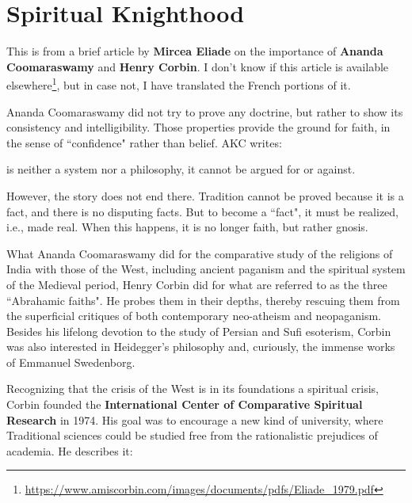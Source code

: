 \section{Spiritual Knighthood}

\begin{quotex}
This is from a brief article by \textbf{Mircea Eliade} on the importance of \textbf{Ananda Coomaraswamy} and \textbf{Henry Corbin}. I don't know if this article is available elsewhere\footnote{\url{https://www.amiscorbin.com/images/documents/pdfs/Eliade_1979.pdf}}, but in case not, I have translated the French portions of it. 

\end{quotex}
Ananda Coomaraswamy did not try to prove any doctrine, but rather to show its consistency and intelligibility. Those properties provide the ground for faith, in the sense of ``confidence" rather than belief. AKC writes:

\begin{quotex}
 is neither a system nor a philosophy, it cannot be argued for or against. 

\end{quotex}
However, the story does not end there. Tradition cannot be proved because it is a fact, and there is no disputing facts. But to become a ``fact", it must be realized, i.e., made real. When this happens, it is no longer faith, but rather gnosis.

What Ananda Coomaraswamy did for the comparative study of the religions of India with those of the West, including ancient paganism and the spiritual system of the Medieval period, Henry Corbin did for what are referred to as the three ``Abrahamic faiths". He probes them in their depths, thereby rescuing them from the superficial critiques of both contemporary neo-atheism and neopaganism. Besides his lifelong devotion to the study of Persian and Sufi esoterism, Corbin was also interested in Heidegger's philosophy and, curiously, the immense works of Emmanuel Swedenborg.

Recognizing that the crisis of the West is in its foundations a spiritual crisis, Corbin founded the \textbf{International Center of Comparative Spiritual Research} in 1974. His goal was to encourage a new kind of university, where Traditional sciences could be studied free from the rationalistic prejudices of academia. He describes it:

